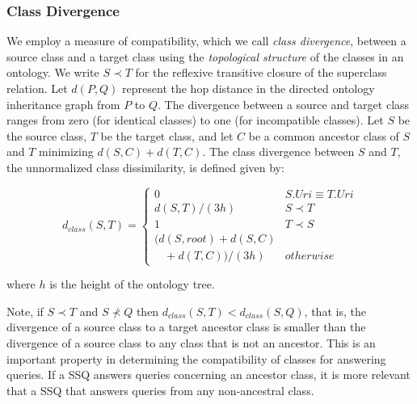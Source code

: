 \subsubsection{Class Divergence}
\label{sec:ctd}

We employ a measure of compatibility, which we call \textit{class divergence},
between a source class and a target class using the \textit{topological
structure} of the classes in an ontology. We write $S \prec T$ for the reflexive
transitive closure of the superclass relation. Let $d(P,Q)$ represent the hop
distance in the directed ontology inheritance graph from $P$ to $Q$. The
divergence between a source and target class ranges from zero (for identical
classes) to one (for incompatible classes). Let $S$ be the source class, $T$ be
the target class, and let $C$ be a common ancestor class of $S$ and $T$
minimizing $d(S,C) + d(T,C)$. The class divergence between $S$ and $T$, the
unnormalized class dissimilarity, is defined given by:

\begin{equation}
d_{class}(S, T) = \begin{cases}
0 & S.{Uri} \equiv T.{Uri}\\
d(S, T)/(3h) & S \prec T\\
1 & T \prec S\\
(d(S,root) + d(S,C) \\ \ \ \ \ + d(T,C))/(3h) & otherwise
\end{cases}
\end{equation}

\noindent where $h$ is the height of the ontology tree.

Note, if $S \prec T$ and $S \not\prec Q$ then $d_{class}(S,T) <
d_{class}(S,Q)$, that is, the divergence of a source class to a target
ancestor class is smaller than the divergence of a source class to any
class that is not an ancestor. This is an important property in
determining the compatibility of classes for answering queries.  If a
SSQ answers queries concerning an ancestor class, it is more relevant
that a SSQ that answers queries from any non-ancestral class.

